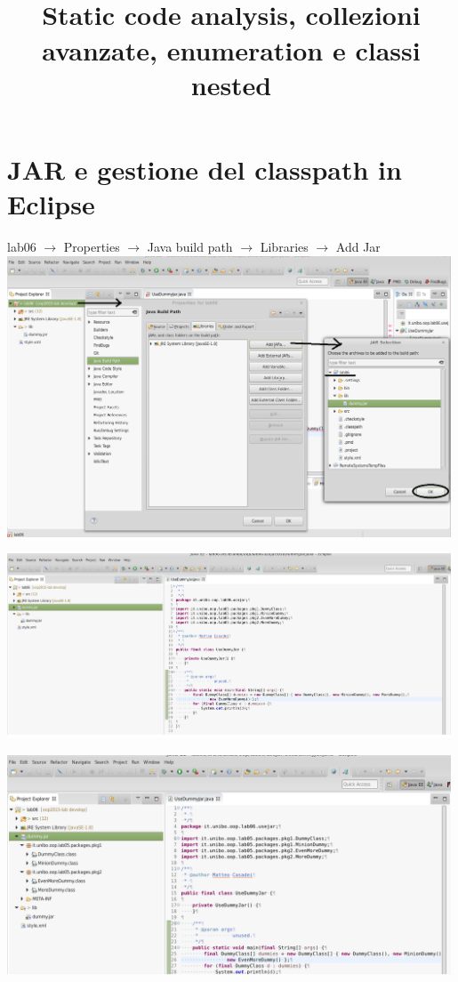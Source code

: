 \documentclass[presentation]{beamer}
\title[OOP\lessonnr{} -- Advanced Collections]{\lessonnr{}\\ Static code analysis, collezioni avanzate, enumeration e classi nested}
\begin{document}
	
\frame[label=coverpage]{\titlepage}

\newcommand{\al}[0]{\textless}
\newcommand{\ar}[0]{\textgreater}
\newcommand{\gen}[1]{\al{}#1\ar{}}
\newcommand{\imgfr}[4]{\fr{#1}{#2
\begin{center}
\texttt{[image: \#4]}                    
\end{center}
}}

\section{JAR e gestione del classpath in Eclipse}

 {
\bl{} {
		lab06 $\rightarrow$ Properties $\rightarrow$ Java build path $\rightarrow$ Libraries $\rightarrow$ Add Jar
	}
	\centering
	\includegraphics[width=0.99\textwidth]{img/addjar-1}
}

 {
	\centering
	\includegraphics[width=0.99\textwidth]{img/addjar-2}
}

 {
	\centering
	\includegraphics[width=0.99\textwidth]{img/addjar-3}
}
\end{document}
